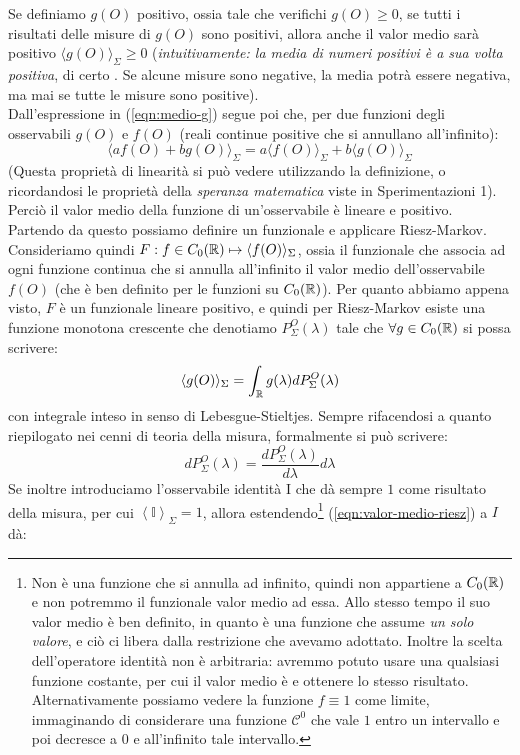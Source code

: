 \documentclass[FisicaTeorica.tex]{subfiles}
\begin{document}
Se definiamo $g(O)$ positivo, ossia tale che verifichi $g(O) \geq 0$, se tutti i risultati delle misure di $g(O)$ sono positivi, allora anche il valor medio sarà positivo $\langle g(O)\rangle_\Sigma \geq 0$ (\textit{intuitivamente: la media di numeri positivi è a sua volta positiva}, di certo . Se alcune misure sono negative, la media potrà essere negativa, ma mai se tutte le misure sono positive).\\
Dall'espressione in (\ref{eqn:medio-g}) segue poi che, per due funzioni degli osservabili $g(O)$ e $f(O)$ (reali continue positive che si annullano all'infinito):
\[
\langle a f(O)+bg(O)\rangle_\Sigma = a\langle f(O)\rangle_\Sigma + b\langle g(O)\rangle_\Sigma
\]
(Questa proprietà di linearità si può vedere utilizzando la definizione, o ricordandosi le proprietà della \textit{speranza matematica} viste in Sperimentazioni 1).\\
Perciò il valor medio della funzione di un'osservabile è lineare e positivo. Partendo da questo possiamo definire un funzionale e applicare Riesz-Markov.\\
Consideriamo quindi $F: f\in C_0(\mathbb{R})\mapsto \langle f(O)\rangle_\Sigma$, ossia il funzionale che associa ad ogni funzione continua che si annulla all'infinito il valor medio dell'osservabile $f(O)$ (che è ben definito per le funzioni su $C_0(\mathbb{R})$). Per quanto abbiamo appena visto, $F$ è un funzionale lineare positivo, e quindi per Riesz-Markov esiste una funzione monotona crescente che denotiamo $P_\Sigma^O(\lambda)$ tale che $\forall g \in C_0(\mathbb{R})$ si possa scrivere: 
\begin{equation}
\langle g(O)\rangle_\Sigma = \int_{\mathbb{R}} g(\lambda) dP_\Sigma^O(\lambda)
    \label{eqn:valor-medio-riesz}
\end{equation}
con integrale inteso in senso di Lebesgue-Stieltjes. Sempre rifacendosi a quanto riepilogato nei cenni di teoria della misura, formalmente si può scrivere:
\begin{equation}
dP_\Sigma^O\left(\lambda\right)=\frac{dP_\Sigma^O\left(\lambda\right)}{d\lambda}d\lambda 
\label{eqn:psigma-change}
\end{equation}
Se inoltre introduciamo l'osservabile identità I che dà sempre $1$ come risultato della misura, per cui $\left\langle\mathbb{I}\right\rangle_\Sigma=1$, allora estendendo\footnote{Non è una funzione che si annulla ad infinito, quindi non appartiene a $C_0(\mathbb{R})$ e non potremmo  il funzionale valor medio ad essa. Allo stesso tempo il suo valor medio è ben definito, in quanto è una funzione che assume \textit{un solo valore}, e ciò ci libera dalla restrizione che avevamo adottato. Inoltre la scelta dell'operatore identità non è arbitraria: avremmo potuto usare una qualsiasi funzione costante, per cui il valor medio è  e ottenere lo stesso risultato. Alternativamente possiamo vedere la funzione $f\equiv 1$ come limite, immaginando di considerare una funzione $\mathcal{C}^0$ che vale $1$ entro un intervallo e poi decresce a $0$ e  all'infinito tale intervallo.} (\ref{eqn:valor-medio-riesz}) a $I$ dà:
\end{document}
